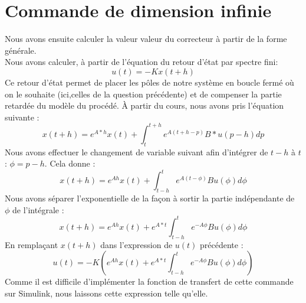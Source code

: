\section{Commande de dimension infinie}
Nous avons ensuite calculer la valeur valeur du correcteur à partir de la forme générale.\\
Nous avons calculer, à partir de l'équation du retour d'état par spectre fini:
\begin{equation}
 u(t) = -K x(t+h)
\end{equation}
Ce retour d'état permet de placer les pôles de notre système en boucle fermé où on le souhaite (ici,celles de la question précédente) et de compenser la partie retardée du modèle du procédé.
À partir du cours, nous avons pris l'équation suivante :
\begin{equation}
x(t+h) = e^{A*h}x(t) + \int_{t}^{t+h} e^{A(t+h-p)}B*u(p-h)dp
\end{equation}
Nous avons effectuer le changement de variable suivant afin d'intégrer de $t-h$ à $t$ : $\phi = p-h$. Cela donne :
\begin{equation}
x(t+h) = e^{Ah} x(t) + \int_{t-h}^{t} e^{A(t-\phi)}Bu(\phi)d\phi
\end{equation}
Nous avons séparer l'exponentielle de la façon à sortir la partie indépendante de $\phi$ de l'intégrale : 
\begin{equation}
x(t+h) = e^{Ah} x(t) + e^{A*t}\int_{t-h}^{t} e^{-A\phi}Bu(\phi)d\phi
\end{equation}
En remplaçant $x(t+h)$ dans l'expression de $u(t)$ précédente : 
\begin{equation}
u(t) = -K \left( e^{Ah} x(t) + e^{A*t}\int_{t-h}^{t} e^{-A\phi}Bu(\phi)d\phi \right)
\end{equation}
Comme il est difficile d'implémenter la fonction de transfert de cette commande sur Simulink, nous laissons cette expression telle qu'elle.
